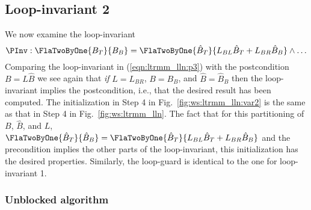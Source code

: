 \subsection{Loop-invariant 2}

We now examine the loop-invariant
\begin{equation}
\label{eqn:ltrmm_lln:p3}
\PInv: 
\FlaTwoByOne{ B_T}{B_B} =
\FlaTwoByOne{ \hat{B}_T }
            { L_{BL} \hat{B}_T + L_{BR} \hat{B}_B }
\wedge
\ldots
\end{equation}
Comparing the loop-invariant in (\ref{eqn:ltrmm_lln:p3}) with the
postcondition $ B = L \hat{B} $ we see again that {\em if} $L=L_{BR}$,
$ B = B_B $, and $ \hat{B} = \hat{B}_B $ then the loop-invariant
implies the postcondition, i.e., that the desired result has been
computed.
%
The initialization in Step 4 in Fig.~\ref{fig:ws:ltrmm_lln:var2}
is the same as that in Step 4 in Fig.~\ref{fig:ws:ltrmm_lln}.
The fact that for this partitioning of $ B $, $ \hat{B} $, and $ L $,
$
\FlaTwoByOne{ \hat{B}_T}
            { \hat{B}_B} =
\FlaTwoByOne{ \hat{B}_T}
            { L_{BL} \hat{B}_T + L_{BR} \hat{B}_B }
$
and the precondition implies the other parts of
the loop-invariant, this initialization has
the desired properties.
%
Similarly, the loop-guard is identical to
the one for loop-invariant 1.

\subsubsection{Unblocked algorithm}


